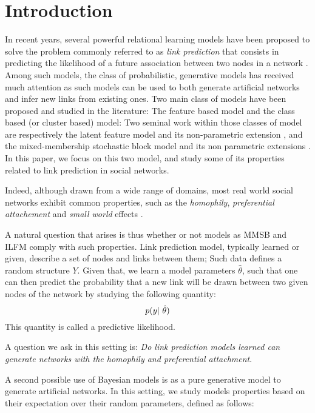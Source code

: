 \section{Introduction}
\label{sec:introduction}
In recent years, several powerful relational learning models have been proposed to solve the problem commonly referred to as \textit{link prediction} that consists in predicting the likelihood of a future association between two nodes in a network \cite{Liben-Nowell07, HassanZaki11}. Among such models, the class of probabilistic, generative models has received much attention as such models can be used to both generate artificial networks and infer new links from existing ones. Two main class of models have been proposed and studied in the literature: The feature based model and the class based (or cluster based) model: Two seminal work within those classes of model are respectively the latent feature model \cite{BMF} and its non-parametric extension \cite{ILFRM}, and the mixed-membership stochastic block model \cite{MMSB} and its non parametric extensions \cite{iMMSB,diMMSB}. In this paper, we focus on this two model, and study some of its properties related to link prediction in social networks. 

Indeed, although drawn from a wide range of domains, most real world social networks exhibit common properties, such as the \textit{homophily}, \textit{preferential attachement} and \textit{small world} effects \cite{Newman2010, Barabasi2003}. 


A natural question that arises is thus whether or not models as MMSB and ILFM comply with such properties. Link prediction model, typically learned or given, describe a set of nodes and links between them; Such data defines a random structure $Y$. Given that, we learn a model parameters $\hat \theta$, such that one can then predict the probability that a new link will be drawn between two given nodes of the network by studying the following quantity:
\begin{equation}
\p(y | \hat \theta)
\end{equation}
This quantity is called a predictive likelihood.


A question we ask in this setting is: \textit{Do link prediction models learned can generate networks with the homophily and preferential attachment}.

A second possible use of Bayesian models is as a pure generative model to generate artificial networks. In this setting, we study models properties based on their expectation over their random parameters, defined as follows:

